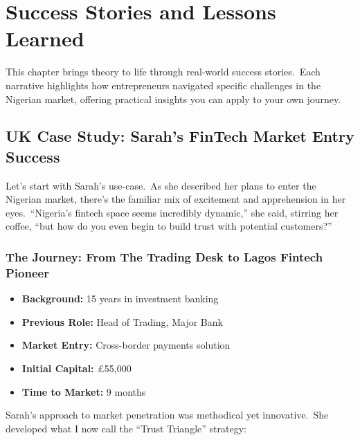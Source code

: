 
\chapter{Success Stories and Lessons Learned}\label{ch:success-stories-and-lessons-learned}

\begin{importantbox}
This chapter brings theory to life through real-world success stories.\ Each narrative highlights how entrepreneurs navigated specific challenges in the Nigerian market, offering practical insights you can apply to your own journey.
\end{importantbox}

\section{UK Case Study: Sarah's FinTech Market Entry Success}\label{sec:uk-case-study:-sarah's-fintech-market-entry-success}

Let's start with Sarah's use-case.\ As she described her plans to enter the Nigerian market, there's the familiar mix of excitement and apprehension in her eyes.\ ``Nigeria's fintech space seems incredibly dynamic,'' she said, stirring her coffee, ``but how do you even begin to build trust with potential customers?''

\subsection{The Journey: From The Trading Desk to Lagos Fintech Pioneer}\label{subsec:the-journey:-from-the-trading-desk-to-lagos-fintech-pioneer}
\begin{tcolorbox}[colback=white,colframe=primarydark,title=\textbf{Sarah's Profile}]
\begin{itemize}
    \item \textbf{Background:} 15 years in investment banking
    \item \textbf{Previous Role:} Head of Trading, Major Bank
    \item \textbf{Market Entry:} Cross-border payments solution
    \item \textbf{Initial Capital:} £55,000
    \item \textbf{Time to Market:} 9 months
\end{itemize}
\end{tcolorbox}

Sarah's approach to market penetration was methodical yet innovative.\ She developed what I now call the ``Trust Triangle'' strategy:

